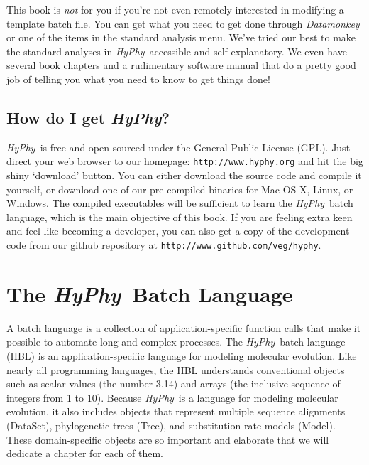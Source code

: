 \documentclass[12pt]{book}
\newcommand{\hyphy}{\textit{HyPhy}}
\begin{document}
This book is {\it not} for you if you're not even remotely interested in modifying a template batch file.  You can get what you need to get done through {\it Datamonkey} or one of the items in the standard analysis menu.  We've tried our best to make the standard analyses in \hyphy\ accessible and self-explanatory.  We even have several book chapters and a rudimentary software manual that do a pretty good job of telling you what you need to know to get things done!  


\section {How do I get \hyphy?}

\hyphy\ is free and open-sourced under the General Public License (GPL).  Just direct your web browser to our homepage: {\tt http://www.hyphy.org} and hit the big shiny `download' button.  You can either download the source code and compile it yourself, or download one of our pre-compiled binaries for Mac OS X, Linux, or Windows.  The compiled executables will be sufficient to learn the \hyphy\ batch language, which is the main objective of this book.  If you are feeling extra keen and feel like becoming a developer, you can also get a copy of the development code from our github repository at {\tt http://www.github.com/veg/hyphy}.





\chapter {The \hyphy\ Batch Language}

A batch language is a collection of application-specific function calls that make it possible to automate long and complex processes.  The \hyphy\ batch language (HBL) is an application-specific language for modeling molecular evolution.  Like nearly all  programming languages, the HBL understands conventional objects such as scalar values (the number 3.14) and arrays (the inclusive sequence of integers from 1 to 10).  Because \hyphy\ is a language for modeling molecular evolution, it also includes objects that represent multiple sequence alignments (DataSet), phylogenetic trees (Tree), and substitution rate models (Model).  These domain-specific objects are so important and elaborate that we will dedicate a chapter for each of them. 
\end{document}
